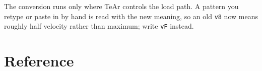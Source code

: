 \documentclass[11pt,a4paper]{article}
\newcommand{\pat}[1]{\texttt{#1}}
\begin{document}
The conversion runs only where TeAr controls the load path. A pattern you
retype or paste in by hand is read with the new meaning, so an old \pat{v8}
now means roughly half velocity rather than maximum; write \pat{vF} instead.

\newpage
\section{Reference}
\label{sec:quickref}

\newcommand{\grp}[3]{%
  \rowcolor{#1}\multicolumn{3}{@{}l@{}}{\rule{0pt}{2.6ex}\textbf{#2}%
    \normalfont\itshape\small\ \,#3}\\[0.4ex]}
\newcommand{\rw}[3]{\pat{#1} & #2 & #3\\}

\renewcommand{\arraystretch}{0.98}
\setlength{\arrayrulewidth}{0.5pt}
\end{document}
